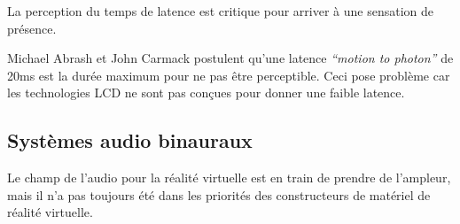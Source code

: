 \documentclass[a4,12pt]{scrartcl}
\begin{document}
La perception du temps de latence est critique pour arriver à une sensation de présence.

Michael Abrash \cite{Abrash12} et John Carmack \cite{Carmack13} postulent qu’une latence \emph{“motion to photon”} de 20ms est la durée maximum pour ne pas être perceptible. Ceci pose problème car les technologies LCD ne sont pas conçues pour donner une faible latence.



\subsection{Systèmes audio binauraux}

Le champ de l’audio pour la réalité virtuelle est en train de prendre de l’ampleur, mais il n’a pas toujours été dans les priorités des constructeurs de matériel de réalité virtuelle.
\end{document}
